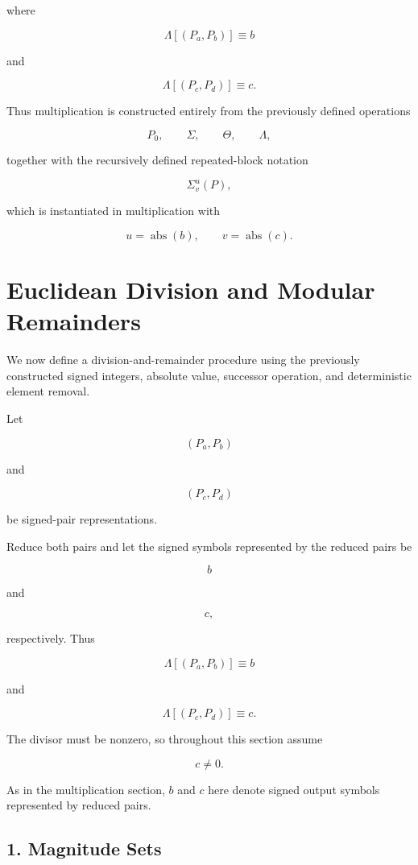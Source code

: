 \documentclass[12pt]{article}
\begin{document}
where

\[
\Lambda[(P_a,P_b)]\equiv b
\]

and

\[
\Lambda[(P_c,P_d)]\equiv c.
\]

Thus multiplication is constructed entirely from the previously defined operations

\[
P_0,
\qquad
\Sigma,
\qquad
\Theta,
\qquad
\Lambda,
\]

together with the recursively defined repeated-block notation

\[
\Sigma^u_v(P),
\]

which is instantiated in multiplication with

\[
u=\operatorname{abs}(b),
\qquad
v=\operatorname{abs}(c).
\]

\section*{Euclidean Division and Modular Remainders}

We now define a division-and-remainder procedure using the previously constructed signed integers, absolute value, successor operation, and deterministic element removal.

Let

\[
(P_a,P_b)
\]

and

\[
(P_c,P_d)
\]

be signed-pair representations.

Reduce both pairs and let the signed symbols represented by the reduced pairs be

\[
b
\]

and

\[
c,
\]

respectively. Thus

\[
\Lambda[(P_a,P_b)]\equiv b
\]

and

\[
\Lambda[(P_c,P_d)]\equiv c.
\]

The divisor must be nonzero, so throughout this section assume

\[
\boxed{c\neq0.}
\]

As in the multiplication section, \(b\) and \(c\) here denote signed output symbols represented by reduced pairs.

\subsection*{1. Magnitude Sets}
\end{document}
